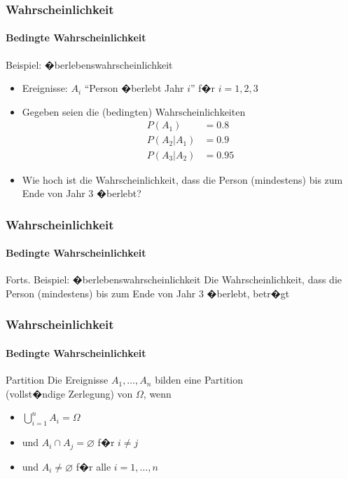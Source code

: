 \documentclass[12pt,show notes]{beamer}
\begin{document}
\begin{frame}
\frametitle{Wahrscheinlichkeit}
\framesubtitle{Bedingte Wahrscheinlichkeit}
\begin{exampleblock}{Beispiel: �berlebenswahrscheinlichkeit}
\begin{itemize}
\item Ereignisse: $A_i$ ``Person �berlebt Jahr $i$'' f�r $i=1,2,3$
\item Gegeben seien die (bedingten) Wahrscheinlichkeiten
\begin{align*}
P(A_1) &= 0.8 \\
P(A_2|A_1) &= 0.9\\
P(A_3|A_2)&= 0.95
\end{align*}
\item Wie hoch ist die Wahrscheinlichkeit, dass die Person (mindestens) bis zum Ende von Jahr 3 �berlebt?
\end{itemize}
\end{exampleblock}
\end{frame}

\begin{frame}
\frametitle{Wahrscheinlichkeit}
\framesubtitle{Bedingte Wahrscheinlichkeit}
\begin{exampleblock}{Forts. Beispiel: �berlebenswahrscheinlichkeit}
Die Wahrscheinlichkeit, dass die Person (mindestens) bis zum Ende von Jahr 3 �berlebt, betr�gt
\end{exampleblock}
\end{frame}

\begin{frame}
\frametitle{Wahrscheinlichkeit}
\framesubtitle{Bedingte Wahrscheinlichkeit}
\begin{block}{Partition}
Die Ereignisse $A_1,\ldots ,A_n$ bilden eine Partition\\ 
(vollst�ndige Zerlegung) von $\Omega$, wenn 
\begin{itemize}
\item $\bigcup_{i=1}^{n}A_{i}=\Omega $ 
\item und $A_{i}\cap A_{j}=\varnothing$ f�r $i\neq j$ 
\item und $A_{i}\neq \varnothing $ f�r alle $i=1,\ldots ,n$
\end{itemize}
\end{block}
\end{frame}
\end{document}
